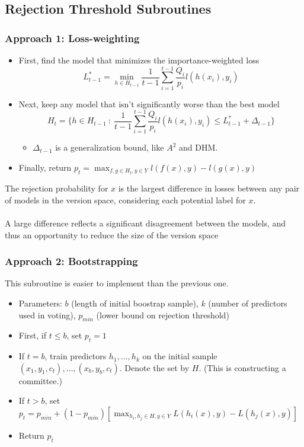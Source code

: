 \documentclass[10pt]{article}
\begin{document}
\subsection*{Rejection Threshold Subroutines}
\subsubsection*{Approach 1: Loss-weighting}
\begin{itemize}
	\item First, find the model that minimizes the importance-weighted loss
	\[L_{t - 1}^* = \min_{h \in H_{t - 1}} \frac{1}{t - 1} \sum_{i = 1}^{t - 1} \frac{Q_i}{p_i} l(h(x_i), y_i)\]
    \item Next, keep any model that isn't significantly worse than the best model
    \[H_t = \{h \in H_{t - 1} \::\: \frac{1}{t - 1} \sum_{i = 1}^{t - 1} \frac{Q_i}{p_i} l(h(x_i), y_i) \leq L_{t - 1}^* + \Delta_{t - 1}\}\]
    \begin{itemize}
	    \item $\Delta_{t - 1}$ is a generalization bound, like $A^2$ and DHM.
    \end{itemize}
    \item Finally, return $p_t = \max_{f, g \in H_t, y \in Y} l(f(x), y) - l(g(x), y)$
\end{itemize}
The rejection probability for $x$ is the largest difference in losses between any pair of models in the version space, considering each potential label for $x$.\\\\
A large difference reflects a significant disagreement between the models, and thus an opportunity to reduce the size of the version space

\subsubsection*{Approach 2: Bootstrapping}
This subroutine is easier to implement than the previous one.
\begin{itemize}
	\item Parameters: $b$ (length of initial boostrap sample), $k$ (number of predictors used in voting), $p_{min}$ (lower bound on rejection threshold)
	\item First, if $t \leq b$, set $p_t = 1$
	\item If $t = b$, train predictors $h_1, \dots, h_k$ on the initial sample $(x_1, y_1, c_t), \dots, (x_b, y_b, c_t)$.  Denote the set by $H$.  (This is constructing a committee.)
	\item If $t > b$, set $p_t = p_{min} + (1 - p_{min})[\max_{h_i, h_j \in H, y \in Y} L(h_i(x), y) - L(h_j(x), y)]$
	\item Return $p_t$
\end{itemize}
\end{document}
